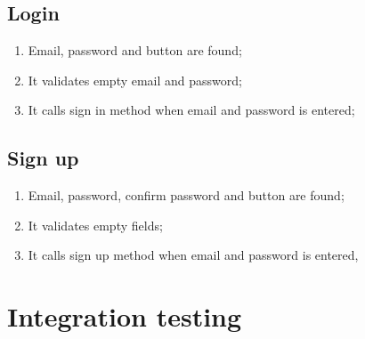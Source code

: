\documentclass[../ITD.tex]{subfiles}
\begin{document}
    \subsection{Login}\label{subsec:login}
    \begin{enumerate}
        \item Email, password and button are found;
        \item It validates empty email and password;
        \item It calls sign in method when email and password is entered;
    \end{enumerate}

    \subsection{Sign up}\label{subsec:sign-up}
    \begin{enumerate}
        \item Email, password, confirm password and button are found;
        \item It validates empty fields;
        \item It calls sign up method when email and password is entered,
    \end{enumerate}

    \section{Integration testing}\label{sec:integration-testing}
\end{document}
